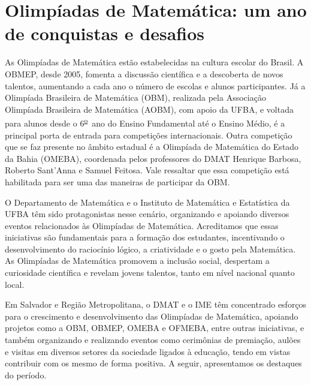\documentclass{hipatia}
\newcommand{\superou}{\textsuperscript{\underline{o}}~}
\begin{document}




\section{Olimpíadas de Matemática: um ano de conquistas e desafios}

As Olimpíadas de Matemática estão estabelecidas na cultura escolar do Brasil. A OBMEP, desde 2005, fomenta a discussão científica e a descoberta de novos talentos, aumentando a cada ano o número de escolas e alunos participantes. Já a Olimpíada Brasileira de Matemática (OBM), realizada pela Associação Olimpíada Brasileira de Matemática (AOBM), com apoio da UFBA, e voltada para alunos desde o 6\superou ano do Ensino Fundamental até o Ensino Médio, é a principal porta de entrada para competições internacionais. Outra competição que se faz presente no âmbito estadual é a Olimpíada de Matemática do Estado da Bahia (OMEBA), coordenada pelos professores do DMAT Henrique Barbosa, Roberto Sant'Anna e Samuel Feitosa. Vale ressaltar que essa competição está habilitada para ser uma das maneiras de participar da OBM.

O Departamento de Matemática %
e o Instituto de Matemática e Estatística da UFBA %
têm sido protagonistas nesse cenário, organizando e apoiando diversos eventos relacionados às Olimpíadas de Matemática. Acreditamos que essas iniciativas são fundamentais para a formação dos estudantes, incentivando o desenvolvimento do raciocínio lógico, a criatividade e o gosto pela Matemática. As Olimpíadas de Matemática promovem a inclusão social, despertam a curiosidade científica e revelam jovens talentos, tanto em nível nacional quanto local.

Em Salvador e Região Metropolitana, o DMAT e o IME têm concentrado esforços para o crescimento e desenvolvimento das Olimpíadas de Matemática, apoiando projetos como a OBM, OBMEP, OMEBA e OFMEBA, entre outras iniciativas, e também organizando e realizando eventos como cerimônias de premiação, aulões e visitas em diversos setores da sociedade ligados à educação, tendo em vistas contribuir com os mesmo de forma positiva. A seguir, apresentamos os destaques do período.
\end{document}
